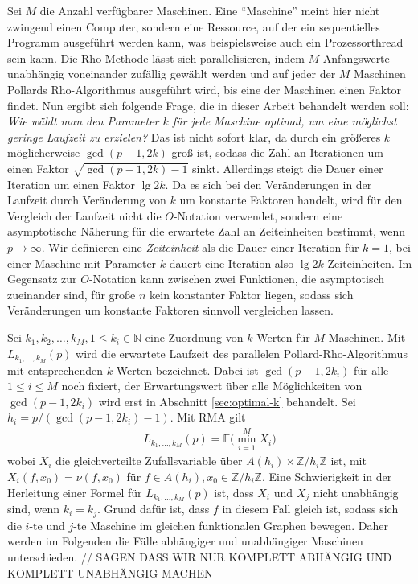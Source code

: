 \documentclass[a4paper, 11pt, ngerman]{article}
\newcommand{\E}{\mathbb{E}}
\newcommand{\N}{\mathbb{N}}
\newcommand{\Z}{\mathbb{Z}}
\begin{document}
Sei $M$ die Anzahl verfügbarer Maschinen. Eine "`Maschine"'  meint hier nicht zwingend einen Computer, sondern eine Ressource, auf der ein sequentielles Programm ausgeführt werden kann, was beispielsweise auch ein Prozessorthread sein kann. Die Rho-Methode lässt sich parallelisieren, indem $M$ Anfangswerte unabhängig voneinander zufällig gewählt werden und auf jeder der $M$ Maschinen Pollards Rho-Algorithmus ausgeführt wird, bis eine der Maschinen einen Faktor findet. Nun ergibt sich folgende Frage, die in dieser Arbeit behandelt werden soll: \emph{Wie wählt man den Parameter $k$ für jede Maschine optimal, um eine möglichst geringe Laufzeit zu erzielen?} Das ist nicht sofort klar, da durch ein größeres $k$ möglicherweise $\gcd(p - 1, 2k)$ groß ist, sodass die Zahl an Iterationen um einen Faktor $\sqrt{\gcd(p - 1, 2k) -1}$ sinkt. Allerdings steigt die Dauer einer Iteration um einen Faktor $\lg 2k$. Da es sich bei den Veränderungen in der Laufzeit durch Veränderung von $k$ um konstante Faktoren handelt, wird für den Vergleich der Laufzeit nicht die $O$-Notation verwendet, sondern eine asymptotische Näherung für die erwartete Zahl an Zeiteinheiten bestimmt, wenn $p \to \infty$. Wir definieren eine \emph{Zeiteinheit} als die Dauer einer Iteration für $k = 1$, bei einer Maschine mit Parameter $k$ dauert eine Iteration also $\lg 2k$ Zeiteinheiten. Im Gegensatz zur $O$-Notation kann zwischen zwei Funktionen, die asymptotisch zueinander sind, für große $n$ kein konstanter Faktor liegen, sodass sich Veränderungen um konstante Faktoren sinnvoll vergleichen lassen.

Sei $k_1, k_2, \dots, k_M, 1 \le k_i \in \N$ eine Zuordnung von $k$-Werten für $M$ Maschinen. Mit $L_{k_1, \dots, k_M}(p)$ wird die erwartete Laufzeit des parallelen Pollard-Rho-Algorithmus mit entsprechenden $k$-Werten bezeichnet. Dabei ist $\gcd(p - 1, 2k_i)$ für alle $1 \le i \le M$ noch fixiert, der Erwartungswert über alle Möglichkeiten von $\gcd(p - 1, 2k_i)$ wird erst in Abschnitt \ref{sec:optimal-k} behandelt. Sei $h_i = p/(\gcd(p - 1, 2k_i) - 1)$. Mit RMA gilt
\begin{align}
    L_{k_1, \dots, k_M}(p) = \E \bigg ( \min_{i = 1}^M X_i \bigg )
    \label{lk-definition}
\end{align}
wobei $X_i$ die gleichverteilte Zufallsvariable über $A(h_i) \times \Z/h_i\Z$ ist, mit $X_i(f, x_0) = \nu(f, x_0)$ für $f \in A(h_i), x_0 \in \Z/h_i\Z$. Eine Schwierigkeit in der Herleitung einer Formel für $L_{k_1, \dots, k_M}(p)$ ist, dass $X_i$ und $X_j$ nicht unabhängig sind, wenn $k_i = k_j$. Grund dafür ist, dass $f$ in diesem Fall gleich ist, sodass sich die $i$-te und $j$-te Maschine im gleichen funktionalen Graphen bewegen.  Daher werden im Folgenden die Fälle abhängiger und unabhängiger Maschinen unterschieden. // SAGEN DASS WIR NUR KOMPLETT ABHÄNGIG UND KOMPLETT UNABHÄNGIG MACHEN
\end{document}
